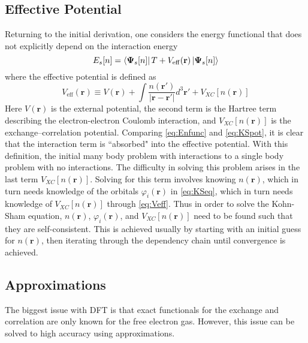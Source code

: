 \documentclass[12pt]{article}
\begin{document}
\subsection*{Effective Potential} %
Returning to the initial derivation, one considers the energy functional that does not explicitly depend on the interaction energy 
\begin{equation}\label{eq:KSpot}
    E_s[n] = \bra{\boldsymbol{\Psi}_s[n]}T+V_{\mathrm{eff}}(\textbf{r})\ket{\boldsymbol{\Psi}_s[n]} 
\end{equation}
where the effective potential is defined as 
\begin{equation}\label{eq:Veff}
    V_{\mathrm{eff}}(\textbf{r}) \equiv V(\textbf{r}) + \int \frac{n(\textbf{r}')}{|\textbf{r}-\textbf{r}'|}d^3\textbf{r}' + V_{XC}[n(\textbf{r})]
\end{equation}
Here $V(\textbf{r})$ is the external potential, the second term is the Hartree term describing the electron-electron Coulomb interaction, and $V_{XC}[n(\textbf{r})]$ is the exchange–correlation potential. Comparing \ref{eq:Enfunc} and \ref{eq:KSpot}, it is clear that the interaction term is ``absorbed" into the effective potential. With this definition, the initial many body problem with interactions to a single body problem with no interactions. The difficulty in solving this problem arises in the last term $V_{XC}[n(\textbf{r})]$. Solving for this term involves knowing $n(\textbf{r})$, which in turn needs knowledge of the orbitals $\varphi_i(\textbf{r})$ in \ref{eq:KSeq}, which in turn needs knowledge of $V_{XC}[n(\textbf{r})]$ through \ref{eq:Veff}. Thus in order to solve the Kohn-Sham equation, $n(\textbf{r})$, $\varphi_i(\textbf{r})$, and $V_{XC}[n(\textbf{r})]$ need to be found such that they are self-consistent. This is achieved usually by starting with an initial guess for $n(\textbf{r})$, then iterating through the dependency chain until convergence is achieved. 
\subsection*{Approximations}
The biggest issue with DFT is that exact functionals for the exchange and correlation are only known for the free electron gas. However, this issue can be solved to high accuracy using approximations. 
\end{document}
